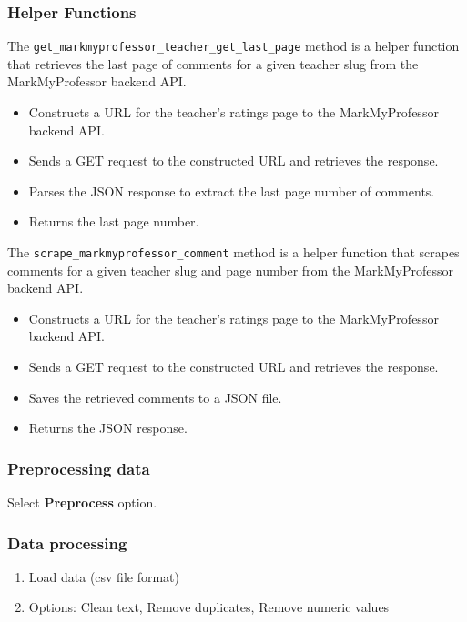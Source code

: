 \subsubsection*{Helper Functions}
The \texttt{get\_markmyprofessor\_teacher\_get\_last\_page} method is a helper function that retrieves the last page of comments for a given teacher slug from the MarkMyProfessor backend API.

\begin{itemize}
    \item Constructs a URL for the teacher's ratings page to the MarkMyProfessor backend API.
    \item Sends a GET request to the constructed URL and retrieves the response.
    \item Parses the JSON response to extract the last page number of comments.
    \item Returns the last page number.
\end{itemize}

The \texttt{scrape\_markmyprofessor\_comment} method is a helper function that scrapes comments for a given teacher slug and page number from the MarkMyProfessor backend API.

\begin{itemize}
    \item Constructs a URL for the teacher's ratings page to the MarkMyProfessor backend API.
    \item Sends a GET request to the constructed URL and retrieves the response.
    \item Saves the retrieved comments to a JSON file.
    \item Returns the JSON response.
\end{itemize}

\subsubsection*{Preprocessing data}
Select \textbf{Preprocess} option.

\subsubsection*{Data processing}
\begin{enumerate}
    \item Load data (csv file format)
    \item Options: Clean text, Remove duplicates, Remove numeric values
\end{enumerate}

